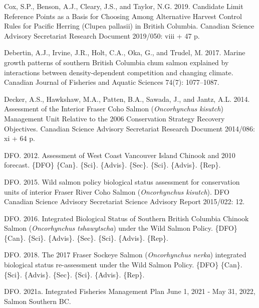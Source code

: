 \documentclass[11pt]{book}
\begin{document}
\begin{CSLReferences}{1}{0}
%
Cox, S.P., Benson, A.J., Cleary, J.S., and Taylor, N.G. 2019. Candidate {Limit} {Reference} {Points} as a {Basis} for {Choosing} {Among} {Alternative} {Harvest} {Control} {Rules} for {Pacific} {Herring} ({Clupea} pallasii) in {British} {Columbia}. Canadian Science Advisory Secretariat Research Document 2019/050: viii + 47 p.

%
Debertin, A.J., Irvine, J.R., Holt, C.A., Oka, G., and Trudel, M. 2017. Marine growth patterns of southern {British} {Columbia} chum salmon explained by interactions between density-dependent competition and changing climate. Canadian Journal of Fisheries and Aquatic Sciences 74(7): 1077--1087.

%
Decker, A.S., Hawkshaw, M.A., Patten, B.A., Sawada, J., and Jantz, A.L. 2014. Assessment of the {Interior} {Fraser} {Coho} {Salmon} (\emph{{Oncorhynchus} kisutch}) {Management} {Unit} {Relative} to the 2006 {Conservation} {Strategy} {Recovery} {Objectives}. Canadian Science Advisory Secretariat Research Document 2014/086: xi + 64 p.

%
DFO. 2012. Assessment of {West} {Coast} {Vancouver} {Island} {Chinook} and 2010 forecast. \{DFO\} \{Can\}. \{Sci\}. \{Advis\}. \{Sec\}. \{Sci\}. \{Advis\}. \{Rep\}.

%
DFO. 2015. Wild salmon policy biological status assessment for conservation units of interior {Fraser} {River} {Coho} {Salmon} (\emph{{Oncorhynchus} kisutch}). DFO Canadian Science Advisory Secretariat Science Advisory Report 2015/022: 12.

%
DFO. 2016. Integrated {Biological} {Status} of {Southern} {British} {Columbia} {Chinook} {Salmon} (\emph{{Oncorhynchus} tshawytscha}) under the {Wild} {Salmon} {Policy}. \{DFO\} \{Can\}. \{Sci\}. \{Advis\}. \{Sec\}. \{Sci\}. \{Advis\}. \{Rep\}.

%
DFO. 2018. The 2017 {Fraser} {Sockeye} {Salmon} (\emph{{Oncorhynchus} nerka}) integrated biological status re-assessment under the {Wild} {Salmon} {Policy}. \{DFO\} \{Can\}. \{Sci\}. \{Advis\}. \{Sec\}. \{Sci\}. \{Advis\}. \{Rep\}.

%
DFO. 2021a. Integrated {Fisheries} {Management} {Plan} {June} 1, 2021 - {May} 31, 2022, {Salmon} {Southern} {BC}.


\end{CSLReferences}
\end{document}
